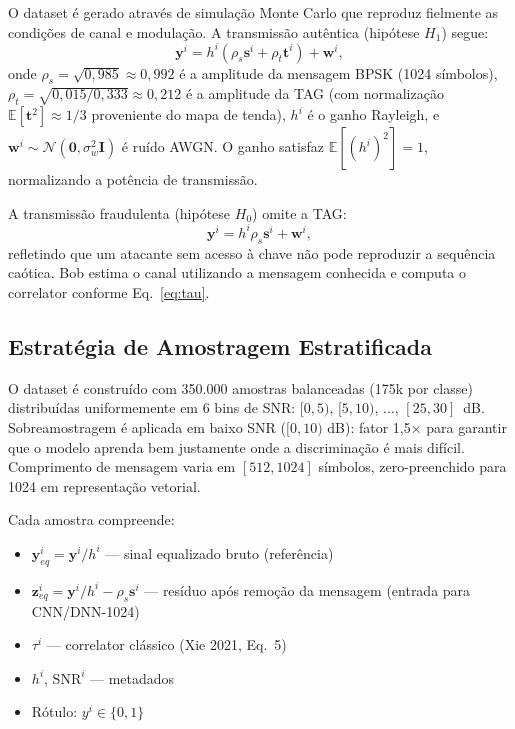 \documentclass{sbrt}
\begin{document}
O dataset é gerado através de simulação Monte Carlo que reproduz fielmente as condições de canal e modulação. A transmissão autêntica (hipótese $H_1$) segue:
\begin{equation}\label{eq:sig_h1}
\mathbf{y}^i = h^i \left( \rho_s \mathbf{s}^i + \rho_t \mathbf{t}^i \right) + \mathbf{w}^i,
\end{equation}
onde $\rho_s = \sqrt{0{,}985} \approx 0{,}992$ é a amplitude da mensagem BPSK (1024 símbolos), $\rho_t = \sqrt{0{,}015 / 0{,}333} \approx 0{,}212$ é a amplitude da TAG (com normalização $\mathbb{E}[\mathbf{t}^2] \approx 1/3$ proveniente do mapa de tenda), $h^i$ é o ganho Rayleigh, e $\mathbf{w}^i \sim \mathcal{N}(\mathbf{0}, \sigma_w^2 \mathbf{I})$ é ruído AWGN. O ganho satisfaz $\mathbb{E}[(h^i)^2] = 1$, normalizando a potência de transmissão.

A transmissão fraudulenta (hipótese $H_0$) omite a TAG:
\begin{equation}\label{eq:sig_h0}
\mathbf{y}^i = h^i \rho_s \mathbf{s}^i + \mathbf{w}^i,
\end{equation}
refletindo que um atacante sem acesso à chave não pode reproduzir a sequência caótica. Bob estima o canal utilizando a mensagem conhecida e computa o correlator conforme Eq.~\ref{eq:tau}.

\subsection{Estratégia de Amostragem Estratificada}

O dataset é construído com 350.000 amostras balanceadas (175k por classe) distribuídas uniformemente em 6 bins de SNR: $[0,5)$, $[5,10)$, $\ldots$, $[25,30]$~dB. Sobreamostragem é aplicada em baixo SNR ($[0,10)$ dB): fator 1,5× para garantir que o modelo aprenda bem justamente onde a discriminação é mais difícil. Comprimento de mensagem varia em $[512, 1024]$ símbolos, zero-preenchido para 1024 em representação vetorial.

Cada amostra compreende:
\begin{itemize}
  \item $\mathbf{y}_{eq}^i = \mathbf{y}^i / h^i$ — sinal equalizado bruto (referência)
  \item $\mathbf{z}_{eq}^i = \mathbf{y}^i / h^i - \rho_s \mathbf{s}^i$ — resíduo após remoção da mensagem (entrada para CNN/DNN-1024)
  \item $\tau^i$ — correlator clássico (Xie 2021, Eq.~5)
  \item $h^i$, $\text{SNR}^i$ — metadados
  \item Rótulo: $y^i \in \{0, 1\}$
\end{itemize}
\end{document}
